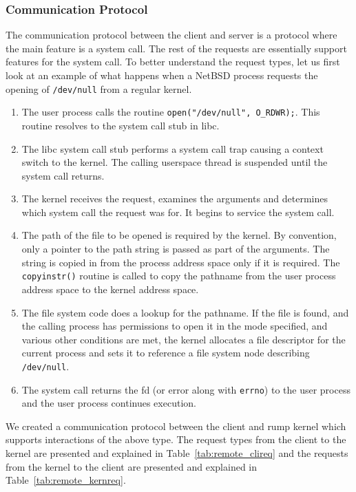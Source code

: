 \subsubsection{Communication Protocol}
\label{sect:commproto}

The communication protocol between the client and server is a protocol
where the main feature is a system call.  The rest of the requests are
essentially support features for the system call.  To better understand
the request types, let us first look at an example of what happens when
a NetBSD process requests the opening of \verb+/dev/null+ from a regular
kernel.

\begin{enumerate}
\item   The user process calls the routine
	\verb+open("/dev/null", O_RDWR);+.  This routine
	resolves to the system call stub in libc.

\item   The libc system call stub performs a system call trap
	causing a context switch to the kernel.
	The calling userspace thread is suspended until the system
	call returns.

\item   The kernel receives the request, examines the arguments and
	determines which system call the request was for.  It begins
	to service the system call.

\item   The path of the file to be opened is required by the kernel.
	By convention, only a pointer to the path string is passed
	as part of the arguments.  The string is copied in from the
	process address space only if it is required.  The \verb+copyinstr()+
	routine is called to copy the pathname from the user process
	address space to the kernel address space.

\item   The file system code does a lookup for the pathname.
	If the file is found, and the calling process has permissions
	to open it in the mode specified, and various other conditions
	are met, the kernel allocates a file descriptor for the
	current process and sets it to reference a file system node
	describing \verb+/dev/null+.

\item   The system call returns the fd (or error along with
	\texttt{errno}) to the user process and the user process continues
	execution.
\end{enumerate}

We created a communication protocol between the client and rump
kernel which supports interactions of the above type.  The request
types from the client to the kernel are presented and explained in
Table~\ref{tab:remote_clireq} and the requests from the kernel to
the client are presented and explained in Table~\ref{tab:remote_kernreq}.

